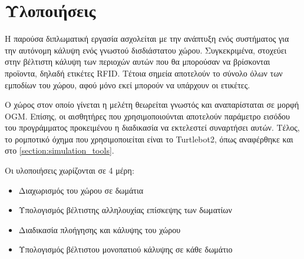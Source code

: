 \chapter{Υλοποιήσεις}
\label{chapter:implementations}

Η παρούσα διπλωματική εργασία ασχολείται με την ανάπτυξη ενός συστήματος για την αυτόνομη κάλυψη ενός γνωστού δισδιάστατου χώρου. Συγκεκριμένα, στοχεύει στην βέλτιστη κάλυψη των περιοχών αυτών που θα μπορούσαν να βρίσκονται προϊοντα, δηλαδή ετικέτες RFID. Τέτοια σημεία αποτελούν το σύνολο όλων των εμποδίων του χώρου, αφού μόνο εκεί μπορούν να υπάρχουν οι ετικέτες. 

Ο χώρος στον οποίο γίνεται η μελέτη θεωρείται γνωστός και αναπαρίσταται σε μορφή OGM. Επίσης, οι αισθητήρες που χρησιμοποιούνται αποτελούν παράμετρο εισόδου του προγράμματος προκειμένου η διαδικασία να εκτελεστεί συναρτήσει αυτών. Τέλος, το ρομποτικό όχημα που χρησιμοποιείται είναι το Turtlebot2, όπως αναφέρθηκε και στο \autoref{section:simulation_tools}.
\smallskip


Οι υλοποιήσεις χωρίζονται σε 4 μέρη:
\begin{itemize}
  \setlength\itemsep{-0.2em}
  \item{Διαχωρισμός του χώρου σε δωμάτια}
  \item{Υπολογισμός βέλτιστης αλληλουχίας επίσκεψης των δωματίων}
  \item{Διαδικασία πλοήγησης και κάλυψης του χώρου}
  \item{Υπολογισμός βέλτιστου μονοπατιού κάλυψης σε κάθε δωμάτιο}
\end{itemize}


\newpage





